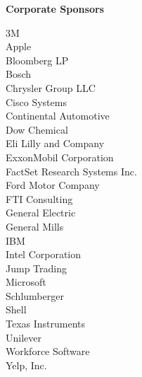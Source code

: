 \documentclass[twoside]{article}
\begin{document}
    { \fontsize{14}{17}\selectfont \bf Corporate Sponsors}
    \vspace{-1em}\begin{multicols}{2}3M\\
        Apple\\
        Bloomberg LP\\
        Bosch\\
        Chrysler Group LLC\\
        Cisco Systems\\
        Continental Automotive\\
        Dow Chemical\\
        Eli Lilly and Company\\
        ExxonMobil Corporation\\
        FactSet Research Systems Inc.\\
        Ford Motor Company\\
        FTI Consulting\\
        General Electric\\
        General Mills\\
        IBM\\
        Intel Corporation\\
        Jump Trading\\
        Microsoft\\
        Schlumberger\\
        Shell\\
        Texas Instruments\\
        Unilever\\
        Workforce Software\\
        Yelp, Inc.\\
        \end{multicols}
    
\end{document}
